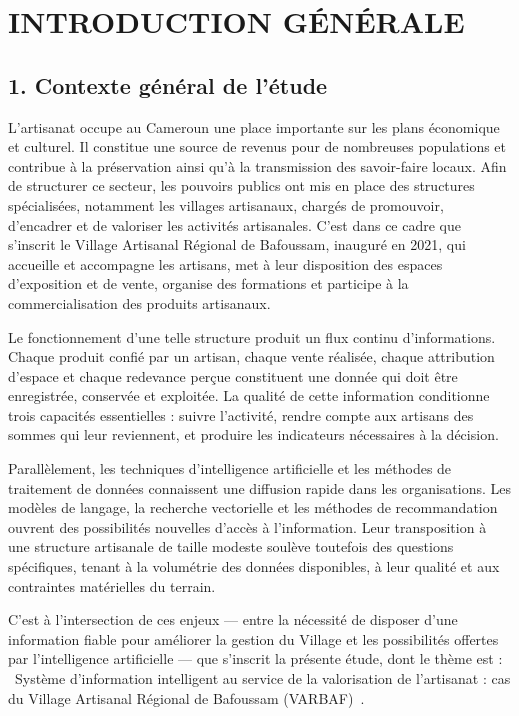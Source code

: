 \chapter*{INTRODUCTION GÉNÉRALE}
\label{sec:intro}

\section*{1. Contexte général de l'étude}

L'artisanat occupe au Cameroun une place importante sur les plans économique et culturel. Il constitue une source de revenus pour de nombreuses populations et contribue à la préservation ainsi qu'à la transmission des savoir-faire locaux. Afin de structurer ce secteur, les pouvoirs publics ont mis en place des structures spécialisées, notamment les villages artisanaux, chargés de promouvoir, d'encadrer et de valoriser les activités artisanales. C'est dans ce cadre que s'inscrit le Village Artisanal Régional de Bafoussam, inauguré en 2021, qui accueille et accompagne les artisans, met à leur disposition des espaces d'exposition et de vente, organise des formations et participe à la commercialisation des produits artisanaux.

Le fonctionnement d'une telle structure produit un flux continu d'informations. Chaque produit confié par un artisan, chaque vente réalisée, chaque attribution d'espace et chaque redevance perçue constituent une donnée qui doit être enregistrée, conservée et exploitée. La qualité de cette information conditionne trois capacités essentielles : suivre l'activité, rendre compte aux artisans des sommes qui leur reviennent, et produire les indicateurs nécessaires à la décision.

Parallèlement, les techniques d'intelligence artificielle et les méthodes de traitement de données connaissent une diffusion rapide dans les organisations. Les modèles de langage, la recherche vectorielle et les méthodes de recommandation ouvrent des possibilités nouvelles d'accès à l'information. Leur transposition à une structure artisanale de taille modeste soulève toutefois des questions spécifiques, tenant à la volumétrie des données disponibles, à leur qualité et aux contraintes matérielles du terrain.

C'est à l'intersection de ces enjeux --- entre la nécessité de disposer d'une information fiable pour améliorer la gestion du Village et les possibilités offertes par l'intelligence artificielle --- que s'inscrit la présente étude, dont le thème est : \guillemotleft~Système d'information intelligent au service de la valorisation de l'artisanat : cas du Village Artisanal Régional de Bafoussam (VARBAF)~\guillemotright.

